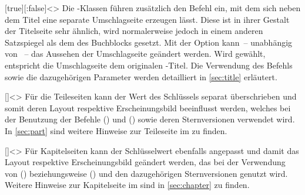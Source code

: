 \begin{Declaration*}{}
\begin{Declaration*}{}
\begin{Declaration*}{}
\begin{Declaration}[%
  v2.02;%
  v2.03!\Option{cdcover=bicolor}:%
    Farbeinsatz nur im Kopf mit farbig abgesetztem Querbalken;
  v2.03!\Option{cdcover=fullcolor}:%
    voller Farbeinsatz mit farbig abgesetztem Querbalken;
  v2.04!\Option{cdcover=barcolor}:nur farbig abgesetzter Querbalken;%
]{}[true][:false]<\cdalias>
\printdeclarationlist%
%
%
Die \TUDScript-Klassen führen zusätzlich den Befehl  ein, mit 
dem sich neben dem Titel eine separate Umschlagseite erzeugen lässt. Diese ist 
in ihrer Gestalt der Titelseite sehr ähnlich, wird normalerweise jedoch in 
einem anderen Satzspiegel als dem des Buchblocks gesetzt. Mit der Option 
 kann~-- unabhängig von ~-- das Aussehen der 
Umschlagseite geändert werden. Wird  gewählt, entspricht 
die Umschlagseite dem originalen \KOMAScript-Titel. Die Verwendung des Befehls 
 sowie die dazugehörigen Parameter werden detailliert in 
\autoref{sec:title} erläutert.
\end{Declaration}

\begin{Declaration}[%
  v2.03!\Option{cdpart=bicolor}:%
    Farbeinsatz nur im Kopf mit farbig abgesetztem Querbalken;
  v2.03!\Option{cdpart=fullcolor}:%
    voller Farbeinsatz mit farbig abgesetztem Querbalken;
  v2.04!\Option{cdpart=barcolor}:nur farbig abgesetzter Querbalken;%
]{}[]<\cdalias>
\printdeclarationlist%
%
%
Für die Teileseiten kann der Wert des Schlüssels  separat 
überschrieben und somit deren Layout respektive Erscheinungsbild beeinflusst 
werden, welches bei der Benutzung der Befehle 
() und () 
sowie deren Sternversionen verwendet wird. In \autoref{sec:part} sind weitere 
Hinweise zur Teileseite im 
\CD zu finden.
\end{Declaration}

\begin{Declaration}[%
  v2.03!\Option{cdchapter=bicolor}:%
    Farbeinsatz nur im Kopf mit farbig abgesetztem Querbalken;
  v2.03!\Option{cdchapter=fullcolor}:%
    voller Farbeinsatz mit farbig abgesetztem Querbalken;
  v2.04!\Option{cdchapter=barcolor}:nur farbig abgesetzter Querbalken;%
]{}[]<\cdalias>
\printdeclarationlist%
%
%
Für Kapitelseiten kann der Schlüsselwert  ebenfalls angepasst 
und damit das Layout respektive Erscheinungsbild geändert werden, das bei der 
Verwendung von () beziehungsweise 
() und den dazugehörigen Sternversionen 
genutzt wird. Weitere Hinweise zur Kapitelseite im \CD sind in 
\autoref{sec:chapter} zu finden.
\end{Declaration}


\end{Declaration*}
\end{Declaration*}
\end{Declaration*}
